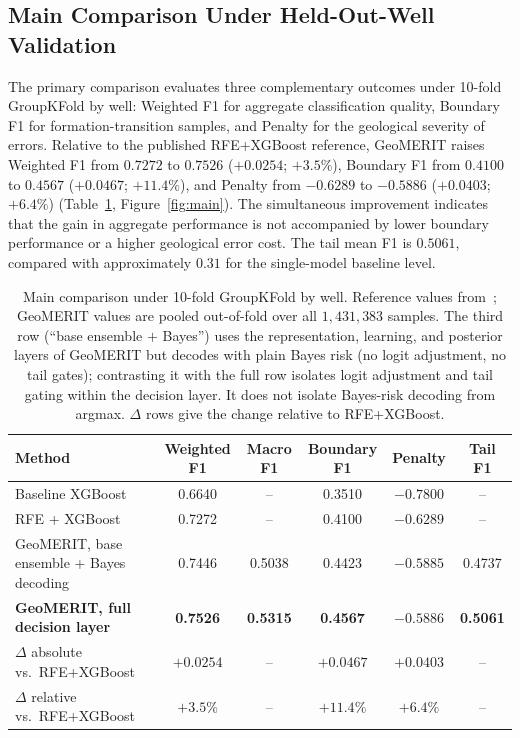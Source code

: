 \documentclass[bdcc,article,submit,pdftex,moreauthors]{Definitions/mdpi}
\begin{document}
\subsection{Main Comparison Under Held-Out-Well Validation}
\label{sec:rq1}
The primary comparison evaluates three complementary outcomes under 10-fold GroupKFold by
well: Weighted F1 for aggregate classification quality, Boundary F1 for formation-transition
samples, and Penalty for the geological severity of errors. Relative to the published
RFE+XGBoost reference, GeoMERIT raises Weighted F1 from $0.7272$ to $0.7526$
($+0.0254$; $+3.5\%$), Boundary F1 from $0.4100$ to $0.4567$ ($+0.0467$; $+11.4\%$), and
Penalty from $-0.6289$ to $-0.5886$ ($+0.0403$; $+6.4\%$) (Table~\ref{tab:main},
Figure~\ref{fig:main}). The simultaneous improvement indicates that the gain in aggregate
performance is not accompanied by lower boundary performance or a higher geological error
cost. The tail mean F1 is $0.5061$, compared with approximately $0.31$ for the single-model
baseline level.

\begin{table}[H]
\caption{Main comparison under 10-fold GroupKFold by well. Reference values from~\cite{chen2026rfe};
GeoMERIT values are pooled out-of-fold over all $1{,}431{,}383$ samples. The third row
(``base ensemble $+$ Bayes'') uses the representation, learning, and posterior layers of
GeoMERIT but decodes with plain Bayes risk (no logit adjustment, no tail gates); contrasting
it with the full row isolates logit adjustment and tail gating within the decision layer. It
does not isolate Bayes-risk decoding from argmax. $\Delta$ rows give the change relative to
RFE+XGBoost.\label{tab:main}}
\begin{tabularx}{\textwidth}{Xccccc}
\toprule
\textbf{Method} & \textbf{Weighted F1} & \textbf{Macro F1} & \textbf{Boundary F1} & \textbf{Penalty} & \textbf{Tail F1}\\
\midrule
Baseline XGBoost~\cite{chen2026rfe} & 0.6640 & -- & 0.3510 & $-0.7800$ & --\\
RFE + XGBoost~\cite{chen2026rfe} & 0.7272 & -- & 0.4100 & $-0.6289$ & --\\
GeoMERIT, base ensemble + Bayes decoding & 0.7446 & 0.5038 & 0.4423 & $-0.5885$ & 0.4737\\
\textbf{GeoMERIT, full decision layer} & \textbf{0.7526} & \textbf{0.5315} & \textbf{0.4567} & $\mathbf{-0.5886}$ & \textbf{0.5061}\\
\midrule
$\Delta$ absolute vs.\ RFE+XGBoost & $+0.0254$ & -- & $+0.0467$ & $+0.0403$ & --\\
$\Delta$ relative vs.\ RFE+XGBoost & $+3.5\%$ & -- & $+11.4\%$ & $+6.4\%$ & --\\
\bottomrule
\end{tabularx}
\end{table}
\end{document}
